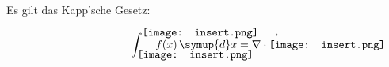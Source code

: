 \documentclass[paper_a4, captions=tableheading, bibliography=totoc]{scrartcl} %
\renewcommand{\kappa}
  {
    \begin{picture}(10,10)\texttt{[image: insert.png]}
    \end{picture}
  }
\begin{document}
 Es gilt das Kapp'sche Gesetz:
 \begin{equation}
\int_{\kappa}^{\kappa} f(x) \, \symup{d}x = \nabla \cdot \vec{\kappa}
 \end{equation}
\end{document}
